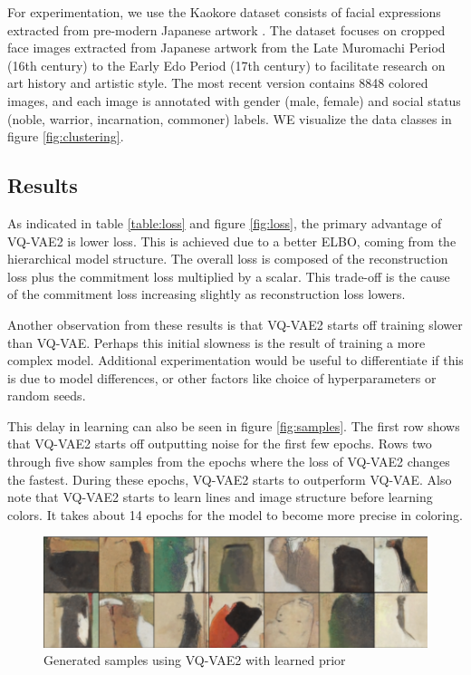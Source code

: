 \documentclass{article}
\begin{document}
For experimentation, we use the Kaokore dataset consists of facial expressions extracted from pre-modern Japanese artwork \cite{kaokore}. The dataset focuses on cropped face images extracted from Japanese artwork from the Late Muromachi Period (16th century) to the Early Edo Period (17th century) to facilitate research on art history and artistic style. The most recent version contains 8848 colored images, and each image is annotated with gender (male, female) and social status (noble, warrior, incarnation, commoner) labels. WE visualize the data classes in figure \ref{fig:clustering}.

\subsection{Results}

As indicated in table \ref{table:loss} and figure \ref{fig:loss}, the primary advantage of VQ-VAE2 is lower loss. This is achieved due to a better ELBO, coming from the hierarchical model structure. The overall loss is composed of the reconstruction loss plus the commitment loss multiplied by a scalar. This trade-off is the cause of the commitment loss increasing slightly as reconstruction loss lowers. 

Another observation from these results is that VQ-VAE2 starts off training slower than VQ-VAE. Perhaps this initial slowness is the result of training a more complex model. Additional experimentation would be useful to differentiate if this is due to model differences, or other factors like choice of hyperparameters or random seeds. 

This delay in learning can also be seen in figure \ref{fig:samples}. The first row shows that VQ-VAE2 starts off outputting noise for the first few epochs. Rows two through five show samples from the epochs where the loss of VQ-VAE2 changes the fastest. During these epochs, VQ-VAE2 starts to outperform VQ-VAE. Also note that VQ-VAE2 starts to learn lines and image structure before learning colors. It takes about 14 epochs for the model to become more precise in coloring.

\begin{figure}
    \centering
    \includegraphics[width=0.7\linewidth]{generations.png}
    \caption{Generated samples using VQ-VAE2 with learned prior}
    \label{fig:generations}
\end{figure}
\end{document}
